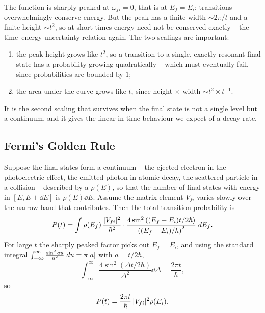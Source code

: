 \documentclass[a4paper]{scrartcl}
\begin{document}
\begin{center}
\end{center}

The function is sharply peaked at $\omega_{fi} = 0$, that is at $E_f = E_i$: transitions overwhelmingly conserve energy. But the peak has a finite width $\sim 2\pi/t$ and a finite height $\sim t^2$, so at short times energy need not be conserved exactly -- the time--energy uncertainty relation again. The two scalings are important:
\begin{enumerate}[label=(\roman*)]
    \item the peak height grows like $t^2$, so a transition to a single, exactly resonant final state has a probability growing quadratically -- which must eventually fail, since probabilities are bounded by $1$;
    \item the area under the curve grows like $t$, since height $\times$ width $\sim t^2 \times t^{-1}$.
\end{enumerate}
It is the second scaling that survives when the final state is not a single level but a continuum, and it gives the linear-in-time behaviour we expect of a decay rate.

\subsection{Fermi's Golden Rule}

Suppose the final states form a continuum -- the ejected electron in the photoelectric effect, the emitted photon in atomic decay, the scattered particle in a collision -- described by a  $\rho(E)$, so that the number of final states with energy in $[E, E+\dd E]$ is $\rho(E)\dd E$. Assume the matrix element $V_{fi}$ varies slowly over the narrow band that contributes. Then the total transition probability is
$$
P(t) = \int \rho(E_f)\, \frac{\lvert V_{fi}\rvert^2}{\hbar^2}\cdot\frac{4\sin^2\left((E_f-E_i)t/2\hbar\right)}{\left((E_f-E_i)/\hbar\right)^2}\; d E_f.
$$
For large $t$ the sharply peaked factor picks out $E_f = E_i$, and using the standard integral $\int_{-\infty}^{\infty}\frac{\sin^2 a u}{u^2}\; d u = \pi \lvert a\rvert$ with $a = t/2\hbar$,
$$
\int_{-\infty}^{\infty}\frac{4\sin^2\left(\Delta t/2\hbar\right)}{\Delta^2}\dd \Delta = \frac{2\pi t}{\hbar},
$$
so
$$
P(t) = \frac{2\pi t}{\hbar}\,\lvert V_{fi}\rvert^2\rho(E_i).
$$
\end{document}
